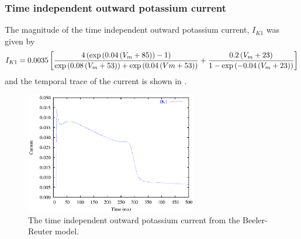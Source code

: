 \subsubsection{Time independent outward potassium current}
The magnitude of the time independent outward potassium current, $I_{K1}$ was
given by 
\begin{equation}
  I_{K1}=0.0035\left[ \dfrac{4\left( \exp\left( 0.04\left( V_m+85 \right) \right)-1 \right)} 
    {\exp\left( 0.08\left( V_m+53 \right) \right)+\exp\left( 0.04\left( Vm+53 \right) \right)} 
    +\dfrac{0.2\left( V_m+23 \right)} {1-\exp\left( -0.04\left( V_m+23 \right) \right)} \right] 
\end{equation}
and the temporal trace of the current is shown in .
\begin{figure}[hbtp] 
  \centering
  \includegraphics[width=75mm]{cardiac_electrophysiology/epsfiles/BR_IK1.eps}
  \caption[Beeler-Reuter time independent potassium current]{The time
    independent outward potassium current from the Beeler-Reuter model.}
  \label{fig:BR_ik1}
\end{figure}
%
